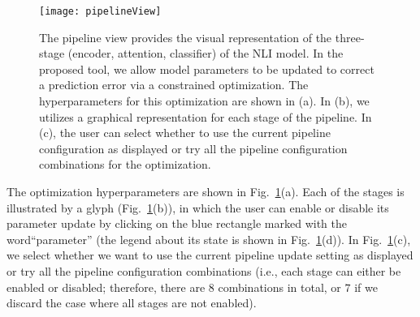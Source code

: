 \begin{figure}[htbp]
\centering
\vspace{-2mm}
 \texttt{[image: pipelineView]}
 \vspace{-2mm}
 \caption{
The pipeline view provides the visual representation of the three-stage (encoder, attention, classifier) of the NLI model. 
%
In the proposed tool, we allow model parameters to be updated to correct a prediction error via a constrained optimization.
The hyperparameters for this optimization are shown in (a). 
In (b), we utilizes a graphical representation for each stage of the pipeline.
In (c), the user can select whether to use the current pipeline configuration as displayed or try all the pipeline configuration combinations for the optimization. %
}
\label{fig:pipelineView}
\vspace{-2mm}
\end{figure}

The optimization hyperparameters are shown in Fig.~\ref{fig:pipelineView}(a). Each of the stages is illustrated by a glyph (Fig.~\ref{fig:pipelineView}(b)), in which the user can enable or disable its parameter update by clicking on the blue rectangle marked with the word``parameter'' (the legend about its state is shown in Fig.~\ref{fig:pipelineView}(d)). In Fig.~\ref{fig:pipelineView}(c), we select whether we want to use the current pipeline update setting as displayed or try all the pipeline configuration combinations (i.e., each stage can either be enabled or disabled; therefore, there are $8$ combinations in total, or $7$ if we discard the case where all stages are not enabled).



